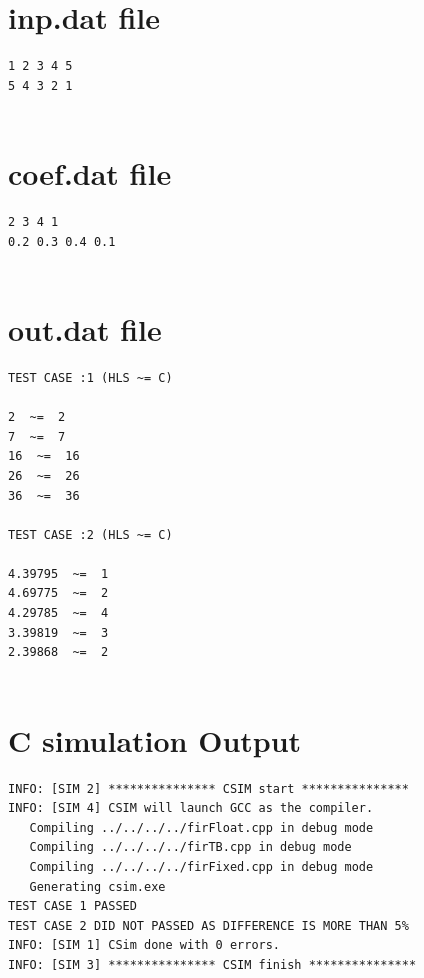 \documentclass{article}
\begin{document}
\section{inp.dat file}
\begin{lstlisting}
1 2 3 4 5
5 4 3 2 1


\end{lstlisting}
\vspace{3cm}
\section{coef.dat file}
\begin{lstlisting}
2 3 4 1 
0.2 0.3 0.4 0.1


\end{lstlisting}
\vspace{3cm}
\section{out.dat file}
\begin{lstlisting}
TEST CASE :1 (HLS ~= C)
     
2  ~=  2
7  ~=  7
16  ~=  16
26  ~=  26
36  ~=  36
 
TEST CASE :2 (HLS ~= C)
     
4.39795  ~=  1
4.69775  ~=  2
4.29785  ~=  4
3.39819  ~=  3
2.39868  ~=  2


\end{lstlisting}
\vspace{3cm}
\section{C simulation Output}
\begin{lstlisting}
INFO: [SIM 2] *************** CSIM start ***************
INFO: [SIM 4] CSIM will launch GCC as the compiler.
   Compiling ../../../../firFloat.cpp in debug mode
   Compiling ../../../../firTB.cpp in debug mode
   Compiling ../../../../firFixed.cpp in debug mode
   Generating csim.exe
TEST CASE 1 PASSED 
TEST CASE 2 DID NOT PASSED AS DIFFERENCE IS MORE THAN 5% 
INFO: [SIM 1] CSim done with 0 errors.
INFO: [SIM 3] *************** CSIM finish ***************



\end{lstlisting}
\vspace{3cm}
\vspace{15cm}
\end{document}
